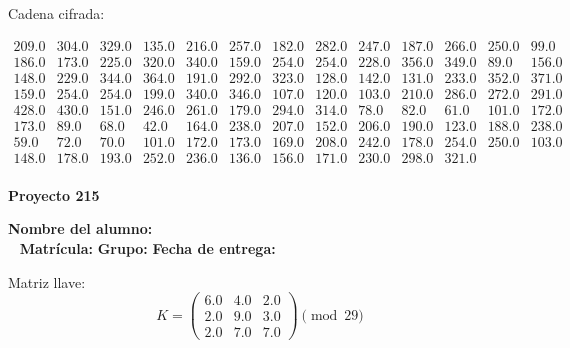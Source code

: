 \documentclass[12pt]{article}
\begin{document}
Cadena cifrada:
\begin{center}
$\begin{array}{lllllllllllll}
209.0 & 304.0 & 329.0 & 135.0 & 216.0 & 257.0 & 182.0 & 282.0 & 247.0 & 187.0 & 266.0 & 250.0 & 99.0\\
186.0 & 173.0 & 225.0 & 320.0 & 340.0 & 159.0 & 254.0 & 254.0 & 228.0 & 356.0 & 349.0 & 89.0 & 156.0\\
148.0 & 229.0 & 344.0 & 364.0 & 191.0 & 292.0 & 323.0 & 128.0 & 142.0 & 131.0 & 233.0 & 352.0 & 371.0\\
159.0 & 254.0 & 254.0 & 199.0 & 340.0 & 346.0 & 107.0 & 120.0 & 103.0 & 210.0 & 286.0 & 272.0 & 291.0\\
428.0 & 430.0 & 151.0 & 246.0 & 261.0 & 179.0 & 294.0 & 314.0 & 78.0 & 82.0 & 61.0 & 101.0 & 172.0\\
173.0 & 89.0 & 68.0 & 42.0 & 164.0 & 238.0 & 207.0 & 152.0 & 206.0 & 190.0 & 123.0 & 188.0 & 238.0\\
59.0 & 72.0 & 70.0 & 101.0 & 172.0 & 173.0 & 169.0 & 208.0 & 242.0 & 178.0 & 254.0 & 250.0 & 103.0\\
148.0 & 178.0 & 193.0 & 252.0 & 236.0 & 136.0 & 156.0 & 171.0 & 230.0 & 298.0 & 321.0\\
\end{array}$
\end{center}

\newpage


\textbf{Proyecto 215}

\textbf{Nombre del alumno:} \underline{\hspace{13cm}}\\\
\vspace{1cm}
\textbf{Matrícula:} \underline{\hspace{4cm}} \hspace{1cm}
\textbf{Grupo:} \underline{\hspace{2cm}}
\textbf{Fecha de entrega:} \underline{\hspace{2cm}}

\medskip

Matriz llave:
\[
K = \begin{pmatrix}
6.0 & 4.0 & 2.0\\
2.0 & 9.0 & 3.0\\
2.0 & 7.0 & 7.0
\end{pmatrix} \pmod{29}
\]
\end{document}
